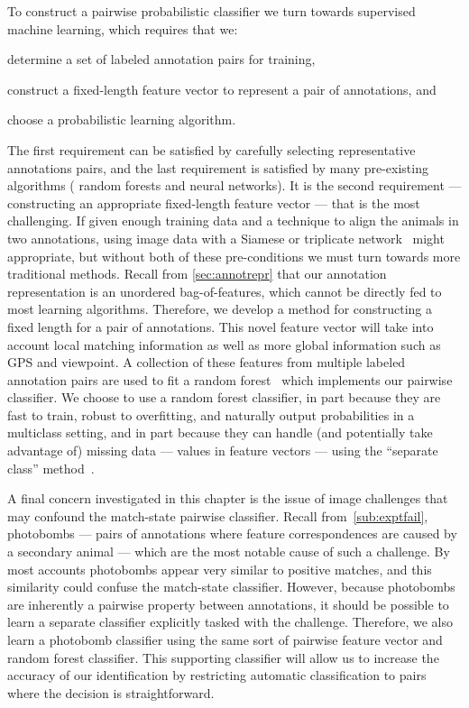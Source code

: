 \MatchStateExample{}

To construct a pairwise probabilistic classifier we turn towards supervised machine learning, which requires that
  we:
\begin{enumin}
    \item determine a set of labeled annotation pairs for training, 

    \item construct a fixed-length feature vector to represent a pair of annotations,  and

    \item choose a probabilistic learning algorithm.
\end{enumin}
The first requirement can be satisfied by carefully selecting representative annotations pairs, and the last
  requirement is satisfied by many pre-existing algorithms (\eg{} random forests and neural networks).
It is the second requirement --- constructing an appropriate fixed-length feature vector --- that is the most
  challenging.
If given enough training data and a technique to align the animals in two annotations, using image data with a
  Siamese or triplicate network~\cite{taigman_deepface_2014,schroff_facenet_2015} might appropriate, but without
  both of these pre-conditions we must turn towards more traditional methods.
Recall from \cref{sec:annotrepr} that our annotation representation is an unordered bag-of-features, which cannot
  be directly fed to most learning algorithms.
Therefore, we develop a method for constructing a fixed length  for a pair of
  annotations.
This novel feature vector will take into account local matching information as well as more global information
  such as GPS and viewpoint.
A collection of these features from multiple labeled annotation pairs are used to fit a random
  forest~\cite{breiman_random_2001} which implements our pairwise classifier.
We choose to use a random forest classifier, in part because they are fast to train, robust to overfitting, and
  naturally output probabilities in a multiclass setting, and in part because they can handle (and potentially take
  advantage of) missing data --- \ie{} \nan{} values in feature vectors --- using the ``separate class''
  method~\cite{ding_investigation_2010}.
  

A final concern investigated in this chapter is the issue of image challenges that may confound the match-state
  pairwise classifier.
Recall from~\cref{sub:exptfail}, {photobombs} --- pairs of annotations where feature correspondences are caused
  by a secondary animal --- which are the most notable cause of such a challenge.
By most accounts photobombs appear very similar to positive matches, and this similarity could confuse the
  match-state classifier.
However, because photobombs are inherently a pairwise property between annotations, it should be possible to
  learn a separate classifier explicitly tasked with the challenge.
Therefore, we also learn a photobomb classifier using the same sort of pairwise feature vector and random forest
  classifier.
This supporting classifier will allow us to increase the accuracy of our identification by restricting automatic
  classification to pairs where the decision is straightforward.


